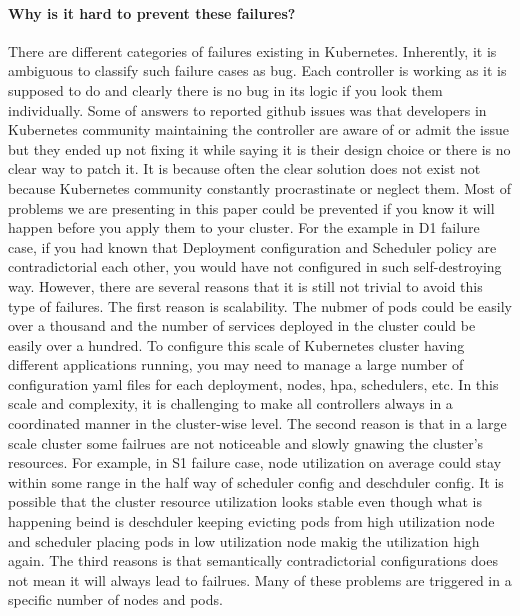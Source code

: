 \paragraph*{Why is it hard to prevent these failures?}
There are different categories of failures existing in Kubernetes. Inherently, it is ambiguous to classify such failure cases as bug. Each controller is working as it is supposed to do and clearly there is no bug in its logic if you look them individually. Some of answers to reported github issues was that developers in Kubernetes community maintaining the controller are aware of or admit the issue but they ended up not fixing it while saying it is their design choice or there is no clear way to patch it. It is because often the clear solution does not exist not because Kubernetes community constantly procrastinate or neglect them. Most of problems we are presenting in this paper could be prevented if you know it will happen before you apply them to your cluster. For the example in D1 failure case, if you had known that Deployment configuration and Scheduler policy are contradictorial each other, you would have not configured in such self-destroying way. However, there are several reasons that it is still not trivial to avoid this type of failures. The first reason is scalability. The nubmer of pods could be easily over a thousand and the number of services deployed in the cluster could be easily over a hundred. To configure this scale of Kubernetes cluster having different applications running, you may need to manage a large number of configuration yaml files for each deployment, nodes, hpa, schedulers, etc. In this scale and complexity, it is challenging to make all controllers always in a coordinated manner in the cluster-wise level. The second reason is that in a large scale cluster some failrues are not noticeable and slowly gnawing the cluster's resources. For example, in S1 failure case, node utilization on average could stay within some range in the half way of scheduler config and deschduler config. It is possible that the cluster resource utilization looks stable even though what is happening beind is deschduler keeping evicting pods from high utilization node and scheduler placing pods in low utilization node makig the utilization high again. The third reasons is that semantically contradictorial configurations does not mean it will always lead to failrues. Many of these problems are triggered in a specific number of nodes and pods. 


